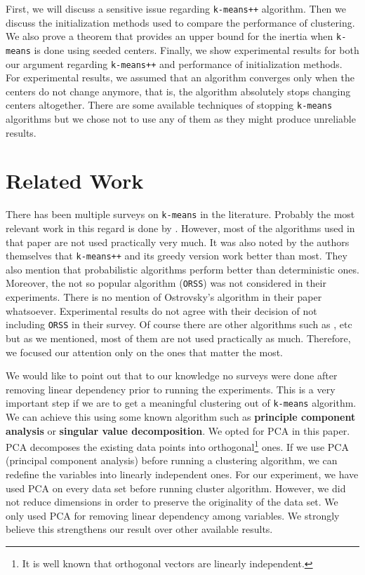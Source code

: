 \documentclass[twoside, 11pt]{article}
\begin{document}
	First, we will discuss a sensitive issue regarding \texttt{k-means++} algorithm. Then we discuss the initialization methods used to compare the performance of clustering. We also prove a theorem that provides an upper bound for the inertia when \texttt{k-means} is done using seeded centers. Finally, we show experimental results for both our argument regarding \texttt{k-means++} and performance of initialization methods. For experimental results, we assumed that an algorithm converges only when the centers do not change anymore, that is, the algorithm absolutely stops changing centers altogether. There are some available techniques of stopping \texttt{k-means} algorithms but we chose not to use any of them as they might produce unreliable results.
	\section{Related Work}
	There has been multiple surveys on \texttt{k-means} in the literature. Probably the most relevant work in this regard is done by \cite{celebi}. However, most of the algorithms used in that paper are not used practically very much. It was also noted by the authors themselves that \texttt{k-means++} and its greedy version work better than most. They also mention that probabilistic algorithms perform better than deterministic ones. Moreover, the not so popular algorithm \citep{ostrovsky} (\texttt{ORSS}) was not considered in their experiments. There is no mention of Ostrovsky's algorithm in their paper whatsoever. Experimental results do not agree with their decision of not including \texttt{ORSS} in their survey. Of course there are other algorithms such as \cite{forgy}, etc but as we mentioned, most of them are not used practically as much. Therefore, we focused our attention only on the ones that matter the most.
	
	We would like to point out that to our knowledge no surveys were done after removing linear dependency prior to running the experiments. This is a very important step if we are to get a meaningful clustering out of \texttt{k-means} algorithm. We can achieve this using some known algorithm such as \textbf{principle component analysis} or \textbf{singular value decomposition}. We opted for PCA in this paper. PCA decomposes the existing data points into orthogonal\footnote{It is well known that orthogonal vectors are linearly independent.} ones. If we use PCA (principal component analysis) before running a clustering algorithm, we can redefine the variables into linearly independent ones. For our experiment, we have used PCA on every data set before running cluster algorithm. However, we did not reduce dimensions in order to preserve the originality of the data set. We only used PCA for removing linear dependency among variables. We strongly believe this strengthens our result over other available results.
\end{document}

